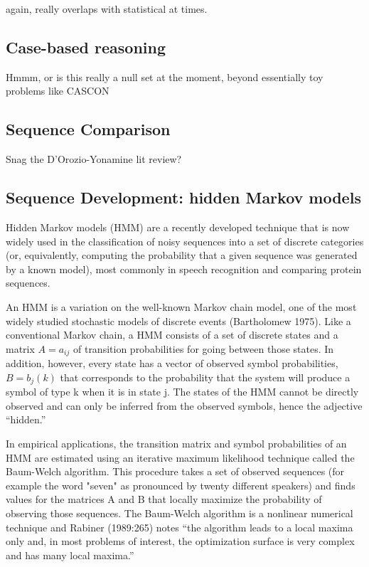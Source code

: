 \documentclass[graybox]{svmult}
\begin{document}
again, really overlaps with statistical at times.

\subsection{Case-based reasoning}
\label{sec:timeseries}

Hmmm, or is this really a null set at the moment, beyond essentially toy problems like CASCON

\subsection{Sequence Comparison}
\label{subsec:seqcompare}

Snag the D'Orozio-Yonamine lit review?

\subsection{Sequence Development: hidden Markov models}
\label{subsec:HMM}

{\color{blue}{[this will be considerably shortened to adjust for the content of the Bond HMM paper]}}

Hidden Markov models (HMM) are a recently developed technique that is now widely used in
the classification of noisy sequences into a set of discrete categories (or, equivalently, computing
the probability that a given sequence was generated by a known model), most commonly in speech recognition and comparing protein sequences.

An HMM is a variation on the well-known Markov chain model, one of the most widely
studied stochastic models of discrete events (Bartholomew 1975). Like a conventional Markov
chain, a HMM consists of a set of discrete states and a matrix $A = a_{ij}$ of transition
probabilities for going between those states. In addition, however, every state has a vector of
observed symbol probabilities, $B = {b_j(k)}$ that corresponds to the probability that the system
will produce a symbol of type k when it is in state j. The states of the HMM cannot be directly
observed and can only be inferred from the observed symbols, hence the adjective ``hidden.''

In empirical applications, the transition matrix and symbol probabilities of an HMM are
estimated using an iterative maximum likelihood technique called the Baum-Welch algorithm.
This procedure takes a set of observed sequences (for example the word "seven" as pronounced
by twenty different speakers) and finds
values for the matrices A and B that locally maximize the probability of observing those
sequences. The Baum-Welch algorithm is a nonlinear numerical technique and Rabiner
(1989:265) notes ``the algorithm leads to a local maxima only and, in most problems of interest,
the optimization surface is very complex and has many local maxima.''
\end{document}
